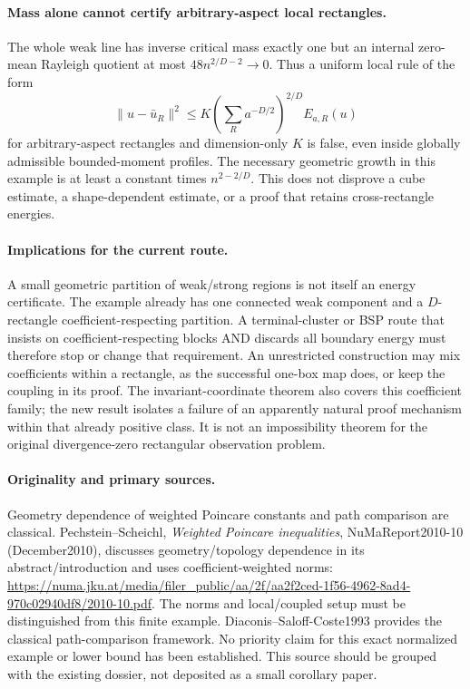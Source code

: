 \documentclass[11pt]{article}
\begin{document}
\paragraph{Mass alone cannot certify arbitrary-aspect local rectangles.}
The whole weak line has inverse critical mass exactly one but an internal zero-mean Rayleigh quotient at most $48n^{2/D-2}\to0$. Thus a uniform local rule of the form
\[
 \|u-\bar u_R\|^2\le K\left(\sum_Ra^{-D/2}\right)^{2/D}E_{a,R}(u)
\]
for arbitrary-aspect rectangles and dimension-only $K$ is false, even inside globally admissible bounded-moment profiles. The necessary geometric growth in this example is at least a constant times $n^{2-2/D}$. This does not disprove a cube estimate, a shape-dependent estimate, or a proof that retains cross-rectangle energies.

\paragraph{Implications for the current route.}
A small geometric partition of weak/strong regions is not itself an energy certificate. The example already has one connected weak component and a $D$-rectangle coefficient-respecting partition. A terminal-cluster or BSP route that insists on coefficient-respecting blocks AND discards all boundary energy must therefore stop or change that requirement. An unrestricted construction may mix coefficients within a rectangle, as the successful one-box map does, or keep the coupling in its proof. The invariant-coordinate theorem also covers this coefficient family; the new result isolates a failure of an apparently natural proof mechanism within that already positive class. It is not an impossibility theorem for the original divergence-zero rectangular observation problem.

\paragraph{Originality and primary sources.}
Geometry dependence of weighted Poincare constants and path comparison are classical. Pechstein--Scheichl, \emph{Weighted Poincare inequalities}, NuMaReport2010-10 (December2010), discusses geometry/topology dependence in its abstract/introduction and uses coefficient-weighted norms:
\url{https://numa.jku.at/media/filer_public/aa/2f/aa2f2ced-1f56-4962-8ad4-970c02940df8/2010-10.pdf}.
The norms and local/coupled setup must be distinguished from this finite example. Diaconis--Saloff-Coste1993 provides the classical path-comparison framework. No priority claim for this exact normalized example or lower bound has been established. This source should be grouped with the existing dossier, not deposited as a small corollary paper.
\end{document}
